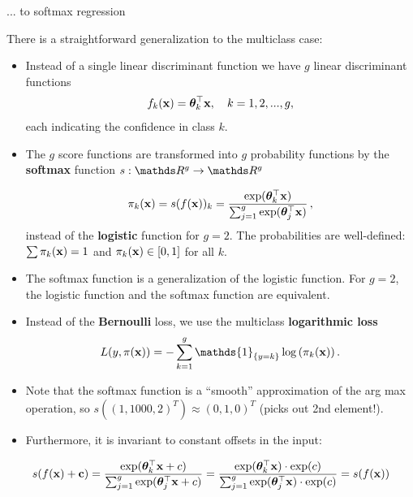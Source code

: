 \documentclass[11pt,compress,t,notes=noshow, xcolor=table]{beamer}
\begin{document}
\begin{vbframe}{... to softmax regression} 

There is a straightforward generalization to the multiclass case: 

\begin{itemize}
  \item Instead of a single linear discriminant function we have $g$ linear discriminant functions
    $$
      f_k(\mathbf{x}) = \bm{\theta}_k^\top \mathbf{x}, \quad k = 1, 2, ..., g,
    $$
  each indicating the confidence in class $k$.
  \item The $g$ score functions are transformed into $g$ probability functions by the \textbf{softmax} function $s:\R^g \to \R^g$ 

  $$
    \pi_k(\mathbf{x}) = s(f(\mathbf{x}))_k = \frac{\exp(\bm{\theta}_k^\top \mathbf{x})}{\sum_{j = 1}^g \exp(\bm{\theta}_j^\top \mathbf{x}) }\,,
  $$
  instead of the \textbf{logistic} function for $g = 2$. The probabilities are well-defined: $\sum \pi_k(\mathbf{x}) = 1$ and $\pi_k(\mathbf{x}) \in [0, 1]$ for all $k$. 

  \item The softmax function is a generalization of the logistic function. For $g = 2$, the logistic function and the softmax function are equivalent. 

  \item Instead of the \textbf{Bernoulli} loss, we use the multiclass \textbf{logarithmic loss}
   $$
    L(y, \pix) = - \sum_{k = 1}^g \mathds{1}_{\{y = k\}} \log\left(\pi_k(\xv)\right).
  $$ 
    \item Note that the softmax function is a \enquote{smooth} approximation of the arg max operation,
        so $s((1, 1000, 2)^T) \approx (0, 1, 0)^T$ (picks out 2nd element!).  
    \item Furthermore, it is invariant to constant offsets in the input:  
      \end{itemize}
    $$ 
    s(f(\mathbf{x}) + \mathbf{c}) = \frac{\exp(\bm{\theta}_k^\top \mathbf{x} + c)}{\sum_{j = 1}^g \exp(\bm{\theta}_j^\top \mathbf{x} + c)} = 
    \frac{\exp(\bm{\theta}_k^\top \mathbf{x})\cdot \exp(c)}{\sum_{j = 1}^g \exp(\bm{\theta}_j^\top \mathbf{x}) \cdot \exp(c)} = 
    s(f(\mathbf{x}))
    $$  


\end{vbframe}
\end{document}
